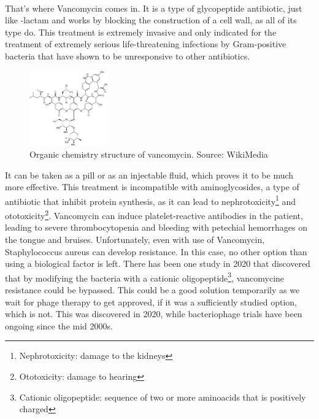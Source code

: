 \paragraph{}That's where Vancomycin comes in. It is a type of glycopeptide antibiotic, just like \beta-lactam and works by blocking the construction of a cell wall, as all of its type do. This treatment is extremely invasive and only indicated for the treatment of extremely serious life-threatening infections by Gram-positive bacteria that have shown to be unresponsive to other antibiotics.\begin{figure}\begin{center}\includegraphics[width=0.30\textwidth]{assets/vancomycin.png}\end{center}\caption{Organic chemistry structure of vancomycin. Source: WikiMedia}\vspace{0.15\linewidth}\end{figure}\newline It can be taken as a pill or as an injectable fluid, which proves it to be much more effective. This treatment is incompatible with aminoglycosides, a type of antibiotic that inhibit protein synthesis, as it can lead to nephrotoxicity\footnote{Nephrotoxicity: damage to the kidneys} and ototoxicity\footnote{Ototoxicity: damage to hearing}. Vancomycin can induce platelet-reactive antibodies in the patient, leading to severe thrombocytopenia and bleeding with petechial hemorrhages on the tongue and bruises. Unfortunately, even with use of Vancomycin, Staphylococcus aureus can develop resistance. In this case, no other option than using a biological factor is left. There has been one study in 2020 that discovered that by modifying the bacteria with a cationic oligopeptide\footnote{Cationic oligopeptide: sequence of two or more aminoacids that is positively charged}, vancomycine resistance could be bypassed. This could be a good solution temporarily as we wait for phage therapy to get approved, if it was a sufficiently studied option, which is not. This was discovered in 2020, while bacteriophage trials have been ongoing since the mid 2000s.
